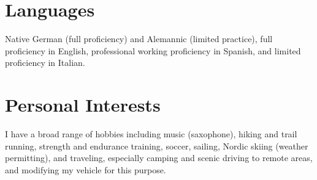 \section{Languages}

Native German (full proficiency) and Alemannic (limited practice), 
full proficiency in English, 
professional working proficiency in Spanish, 
and limited proficiency in Italian.

\section{Personal Interests}

I have a broad range of hobbies including music (saxophone), 
hiking and trail running, 
strength and endurance training,
soccer,
sailing,
Nordic skiing (weather permitting),
and traveling, especially camping and scenic driving to remote areas, and modifying my vehicle for this purpose.
